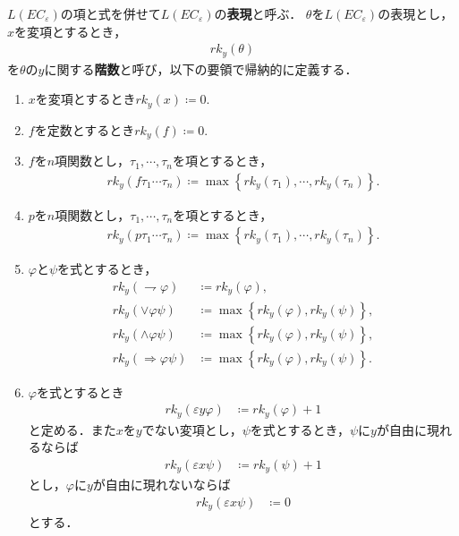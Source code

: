 	$L(EC_{\varepsilon})$の項と式を併せて$L(EC_{\varepsilon})$の{\bf 表現}と呼ぶ．
	$\theta$を$L(EC_{\varepsilon})$の表現とし，$x$を変項とするとき，
	\begin{align}
		rk_{y}(\theta)
	\end{align}
	を$\theta$の$y$に関する{\bf 階数}と呼び，以下の要領で帰納的に定義する．
	\begin{enumerate}
		\item $x$を変項とするとき$rk_{y}(x) \coloneqq 0$.
		\item $f$を定数とするとき$rk_{y}(f) \coloneqq 0$.
		\item $f$を$n$項関数とし，$\tau_{1},\cdots,\tau_{n}$を項とするとき，
			\begin{align}
				rk_{y}(f\tau_{1}\cdots\tau_{n}) \coloneqq
				\max\left\{rk_{y}(\tau_{1}),\cdots,rk_{y}(\tau_{n})\right\}.
			\end{align}
		\item $p$を$n$項関数とし，$\tau_{1},\cdots,\tau_{n}$を項とするとき，
			\begin{align}
				rk_{y}(p\tau_{1}\cdots\tau_{n}) \coloneqq
				\max\left\{rk_{y}(\tau_{1}),\cdots,rk_{y}(\tau_{n})\right\}.
			\end{align}
		\item $\varphi$と$\psi$を式とするとき，
			\begin{align}
				rk_{y}(\rightharpoondown \varphi) &\coloneqq rk_{y}(\varphi), \\
				rk_{y}(\vee \varphi \psi) &\coloneqq \max\left\{rk_{y}(\varphi),rk_{y}(\psi)\right\}, \\
				rk_{y}(\wedge \varphi \psi) &\coloneqq \max\left\{rk_{y}(\varphi),rk_{y}(\psi)\right\}, \\
				rk_{y}(\Longrightarrow \varphi \psi) &\coloneqq \max\left\{rk_{y}(\varphi),rk_{y}(\psi)\right\}.
			\end{align}
		\item $\varphi$を式とするとき
			\begin{align}
				rk_{y}(\varepsilon y \varphi) &\coloneqq rk_{y}(\varphi) + 1
			\end{align}
			と定める．また$x$を$y$でない変項とし，$\psi$を式とするとき，$\psi$に$y$が自由に現れるならば
			\begin{align}
				rk_{y}(\varepsilon x \psi) &\coloneqq rk_{y}(\psi) + 1
			\end{align}
			とし，$\varphi$に$y$が自由に現れないならば
			\begin{align}
				rk_{y}(\varepsilon x \psi) &\coloneqq 0
			\end{align}
			とする．
	\end{enumerate}
	
